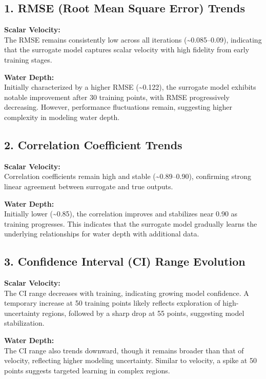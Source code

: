 \documentclass[draft,linenumbers,onecolumn]{agujournal2019} %
\begin{document}
\subsection*{1. RMSE (Root Mean Square Error) Trends}

\textbf{Scalar Velocity:} \\
The RMSE remains consistently low across all iterations (\textasciitilde0.085–0.09), indicating that the surrogate model captures scalar velocity with high fidelity from early training stages.

\textbf{Water Depth:} \\
Initially characterized by a higher RMSE (\textasciitilde0.122), the surrogate model exhibits notable improvement after 30 training points, with RMSE progressively decreasing. However, performance fluctuations remain, suggesting higher complexity in modeling water depth.

\subsection*{2. Correlation Coefficient Trends}

\textbf{Scalar Velocity:} \\
Correlation coefficients remain high and stable (\textasciitilde0.89–0.90), confirming strong linear agreement between surrogate and true outputs.

\textbf{Water Depth:} \\
Initially lower (\textasciitilde0.85), the correlation improves and stabilizes near 0.90 as training progresses. This indicates that the surrogate model gradually learns the underlying relationships for water depth with additional data.

\subsection*{3. Confidence Interval (CI) Range Evolution}

\textbf{Scalar Velocity:} \\
The CI range decreases with training, indicating growing model confidence. A temporary increase at 50 training points likely reflects exploration of high-uncertainty regions, followed by a sharp drop at 55 points, suggesting model stabilization.

\textbf{Water Depth:} \\
The CI range also trends downward, though it remains broader than that of velocity, reflecting higher modeling uncertainty. Similar to velocity, a spike at 50 points suggests targeted learning in complex regions.
\end{document}
